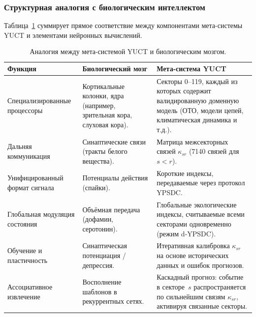 \documentclass[11pt,a4paper]{article}
\begin{document}
	\subsubsection*{Структурная аналогия с биологическим интеллектом}
	Таблица~\ref{tab:brain-analogy} суммирует прямое соответствие между компонентами мета-системы YUCT и элементами нейронных вычислений.
	
	\begin{table}[htbp]
		\centering
		\caption{Аналогия между мета-системой YUCT и биологическим мозгом.}
		\label{tab:brain-analogy}
		\small
		\begin{tabular}{p{3.5cm}p{5.5cm}p{5.5cm}}
			\toprule
			\textbf{Функция} & \textbf{Биологический мозг} & \textbf{Мета-система YUCT} \\
			\midrule
			Специализированные процессоры &
			Кортикальные колонки, ядра (например, зрительная кора, слуховая кора). &
			Секторы 0--119, каждый из которых содержит валидированную доменную модель (ОТО, модели цепей, климатическая динамика и т.д.). \\
			\midrule
			Дальняя коммуникация &
			Синаптические связи (тракты белого вещества). &
			Матрица межсекторных связей
			\(\kappa_{sr}\) (7140 связей для \(s<r\)). \\
			\midrule
			Унифицированный формат сигнала &
			Потенциалы действия (спайки). &
			Короткие индексы, передаваемые через протокол YPSDC. \\
			\midrule
			Глобальная модуляция состояния &
			Объёмная передача (дофамин, серотонин). &
			Глобальные экологические индексы, считываемые всеми секторами одновременно (режим d‑YPSDC). \\
			\midrule
			Обучение и пластичность &
			Синаптическая потенциация / депрессия. &
			Итеративная калибровка \(\kappa_{sr}\) на основе исторических данных и ошибок прогнозов. \\
			\midrule
			Ассоциативное извлечение &
			Восполнение шаблонов в рекуррентных сетях. &
			Каскадный прогноз: событие в секторе~\(s\) распространяется по сильнейшим связям \(\kappa_{sr}\), активируя связанные секторы. \\
			\bottomrule
		\end{tabular}
	\end{table}
	
\end{document}
